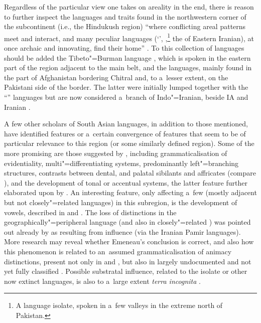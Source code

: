 Regardless of the particular view one takes on areality in the end, there is reason to further inspect the languages and traits found in the northwestern corner of the subcontinent (i.e., the Hindukush region) ``where conflicting areal patterns meet and interact, and many peculiar languages (`\iliDardic', \iliBurushaski,\footnote{A language isolate, spoken in a~few valleys in the extreme north of Pakistan.} the \iliPamirgroup of Eastern Iranian), at once archaic and innovating, find their home'' \citep[225]{masica2001}. To this collection of languages should be added the Tibeto"=Burman language \iliBalti, which is spoken in the eastern part of the region adjacent to the main \iliShina belt, and the \iliNuristani languages, mainly found in the part of Afghanistan bordering Chitral and, to a~lesser extent, on the Pakistani side of the border. The latter were initially lumped together with the ``\iliDardic'' languages but are now considered a~branch of Indo"=Iranian, beside IA and Iranian \citep{degener2002,strand2001}.


A few other scholars of South Asian languages, in addition to those mentioned, have identified features or a~certain convergence of features that seem to be of particular relevance to this region (or some similarly defined region). Some of the more promising are those suggested by \citet{bashir2003}, including grammaticalisation of evidentiality, multi"=differentiating  systems, predominantly left"=branching structures, contrasts between dental,  and palatal sibilants and affricates (compare \citealt{tikkanen2008}), and the development of tonal or accentual systems, the latter feature further elaborated upon by \citet{baart2014}. An interesting feature, only affecting a~few (mostly adjacent but not closely"=related languages) in this subregion, is the development of  vowels, described in \citet{morch1997} and \citet{heegardmorch2004}. The loss of  distinctions in the geographically"=peripheral \iliIndoAryan language \iliKhowar (and also in closely"=related \iliKalasha) was pointed out already by \citet{emeneau1965} as resulting from \iliPersian influence (via the Iranian Pamir languages). More research may reveal whether Emeneau's conclusion is correct, and also how this phenomenon is related to an~assumed grammaticalisation of animacy distinctions, present not only in \iliKhowar and \iliKalasha \citep[401]{bashir1988}, but also in largely undocumented and not yet fully classified \iliDameli \citep[4--6]{perder2013}. Possible substratal influence, related to the isolate \iliBurushaski or other now extinct languages, is also to a~large extent \textit{terra incognita} \citep{tikkanen1988}.


